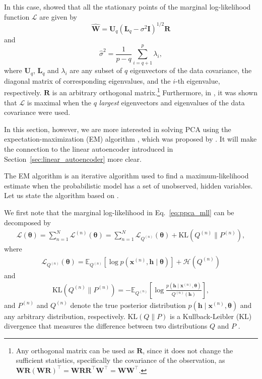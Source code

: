 \documentclass{now}
\newcommand{\vect}[1]{\mathbf{#1}}
\newcommand{\vects}[1]{\boldsymbol{#1}}
\newcommand{\matr}[1]{\mathbf{#1}}
\newcommand{\vh}[0]{\vect{h}}
\newcommand{\vx}[0]{\vect{x}}
\newcommand{\mW}[0]{\matr{W}}
\newcommand{\mU}[0]{\matr{U}}
\newcommand{\mR}[0]{\matr{R}}
\newcommand{\mI}{\matr{I}}
\newcommand{\mL}{\matr{L}}
\newcommand{\TT}[0]{{\vects{\theta}}}
\newcommand{\LL}[0]{\mathcal{L}}
\newcommand{\HH}[0]{\mathcal{H}}
\newcommand{\KL}[0]{\text{KL}}
\newcommand{\E}[0]{\mathbb{E}}
\begin{document}
In this case, \citet{Tipping1999} showed that all the 
stationary points of the marginal log-likelihood function
$\LL$ are given by
\[
\hat{\mW} = \mU_q \left( \mL_q - \sigma^2 \mI \right)^{1/2}
\mR
\]
and
\[
\hat{\sigma}^2 = \frac{1}{p - q} \sum_{i=q+1}^p \lambda_i,
\]
where $\mU_q$, $\mL_q$ and $\lambda_i$ are any subset of
$q$ eigenvectors of the data covariance, the diagonal matrix
of corresponding eigenvalues, and the $i$-th eigenvalue,
respectively. $\mR$ is an arbitrary orthogonal
matrix.\footnote{
Any orthogonal matrix can be used as $\mR$, since it does
not change the sufficient statistics, specifically the
covariance of the observation, as $\mW\mR\left( \mW\mR\right)^\top
= \mW\mR \mR^\top \mW^\top = \mW\mW^\top$.
}
Furthermore, in \citep{Tipping1999}, it was shown that $\LL$
is maximal when the $q$ \textit{largest} eigenvectors and
eigenvalues of the data covariance were used.

In this section, however, we are more interested in solving PCA
using the expectation-maximization
(EM) algorithm
\citep{Dempster1977}, which was proposed by \citet{Roweis1998}.
It will make the connection to the linear autoencoder introduced
in Section~\ref{sec:linear_autoencoder} more clear.

The EM algorithm is an iterative algorithm used to find a
maximum-likelihood estimate when the probabilistic model
has a set of unobserved, hidden variables. Let us state the
algorithm based on \citep{Neal1999,Bishop2006}.

We first note that the marginal log-likelihood in
Eq.~\eqref{eq:ppca_mll} can be decomposed by
\begin{align}
    \label{eq:mll_decom}
    \LL(\TT) = \sum_{n=1}^N \LL^{(n)}(\TT) = \sum_{n=1}^N
    \LL_{Q^{(n)}}(\TT) + \KL(Q^{(n)} \| P^{(n)}),
\end{align}
where
\begin{align}
    \label{eq:mll_post}
    \LL_{Q^{(n)}}(\TT) = \E_{Q^{(n)}} \left[ \log
    p(\vx^{(n)}, \vh \mid
    \TT)\right] + \HH(Q^{(n)})
\end{align}
and
\begin{align}
    \label{eq:kldiv}
    \KL(Q^{(n)} \| P^{(n)}) = -\E_{Q^{(n)}} \left[ \log
    \frac{p(\vh \mid \vx^{(n)},
    \TT)}{Q^{(n)}(\vh)} \right],
\end{align}
and $P^{(n)}$ and $Q^{(n)}$ denote the true posterior distribution
$p(\vh \mid \vx^{(n)}, \TT)$ and any arbitrary distribution,
respectively. $\KL(Q \| P)$ is a Kullback-Leibler
(KL)
divergence that measures the difference between two
distributions $Q$ and $P$ \citep{Kullback1951}.
\end{document}
